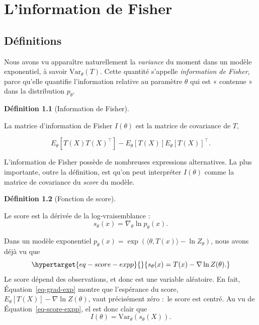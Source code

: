 \documentclass[
  10,
  letterpaper,
  DIV=11,
  numbers=noendperiod]{scrreport}
\theoremstyle{plain}
\theoremstyle{definition}
\theoremstyle{plain}
\theoremstyle{definition}
\newtheorem{definition}{Définition}[chapter]
\theoremstyle{definition}
\theoremstyle{plain}
\theoremstyle{remark}
\begin{document}

\hypertarget{linformation-de-fisher}{%
\chapter{L'information de Fisher}\label{linformation-de-fisher}}

\hypertarget{duxe9finitions-1}{%
\section{Définitions}\label{duxe9finitions-1}}

Nous avons vu apparaître naturellement la \emph{variance} du moment dans
un modèle exponentiel, à savoir \(\mathrm{Var}_\theta(T)\). Cette
quantité s'appelle \emph{information de Fisher}, parce qu'elle quantifie
l'information relative au paramètre \(\theta\) qui est « contenue » dans
la distribution \(p_\theta\).

\begin{definition}[Information de
Fisher]\protect\hypertarget{def-information}{}\label{def-information}

La matrice d'information de Fisher \(I(\theta)\) est la matrice de
covariance de \(T\),

\[E_\theta[T(X)T(X)^\top] - E_\theta[T(X)]E_\theta[T(X)]^\top.\]

\end{definition}

L'information de Fisher possède de nombreuses expressions alternatives.
La plus importante, outre la définition, est qu'on peut interpréter
\(I(\theta)\) comme la matrice de covariance du \emph{score} du modèle.

\begin{definition}[Fonction de
score]\protect\hypertarget{def-score}{}\label{def-score}

Le score est la dérivée de la log-vraisemblance :
\[ s_\theta(x) = \nabla_\theta \ln p_\theta(x).\]

\end{definition}

Dans un modèle exponentiel
\(p_\theta(x) = \exp(\langle \theta, T(x)\rangle - \ln Z_\theta)\), nous
avons déjà vu que
\begin{equation}\protect\hypertarget{eq-score-expp}{}{ s_\theta(x) =  T(x) - \nabla \ln Z(\theta).}\label{eq-score-expp}\end{equation}
Le score dépend des observations, et donc est une variable aléatoire. En
fait, Équation~\ref{eq-grad-exp} montre que l'espérance du score,
\(E_\theta[T(X)] - \nabla \ln Z(\theta)\), vaut précisément zéro :~le
score est centré. Au vu de Équation~\ref{eq-score-expp}, el est donc
clair que \[ I(\theta) = \mathrm{Var}_\theta(s_\theta(X)).\]
\end{document}
